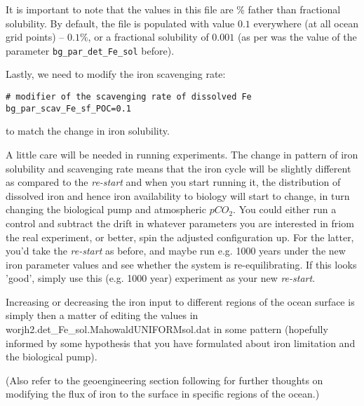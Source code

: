 \begin{enumerate}[noitemsep]
It is important to note that the values in this file are \% father than fractional solubility. By default, the file is populated with value \(0.1\) everywhere (at all ocean grid points) -- \(0.1\%\), or a fractional solubility of \(0.001\) (as per was the value of the parameter \texttt{\small bg\_par\_det\_Fe\_sol} before).

\vspace{1mm}
Lastly, we need to modify the iron scavenging rate:
\vspace{-1mm}\small\begin{verbatim}
# modifier of the scavenging rate of dissolved Fe
bg_par_scav_Fe_sf_POC=0.1
\end{verbatim}\normalsize\vspace{-1mm}
to match the change in iron solubility.

\vspace{1mm}
A little care will be needed in running experiments. The change in pattern of iron solubility and  scavenging rate means that the iron cycle will be slightly different as compared to the \textit{re-start} and when you start running it, the distribution of dissolved iron and hence iron availability to biology will start to change, in turn changing the biological pump and atmospheric \(pCO_{2}\). You could either run a control and subtract the drift in whatever parameters you are interested in friom the real experiment, or better, spin the adjusted configuration up. For the latter, you'd take the \textit{re-start} as before, and maybe run e.g. 1000 years under the new iron parameter values and see whether the system is re-equilibrating. If this looks 'good', simply use this (e.g. 1000 year) experiment as your new \textit{re-start}.

\vspace{1mm}
Increasing or decreasing the iron input to different regions of the ocean surface is simply then a matter of editing the values in \textsf{\footnotesize worjh2.det\_Fe\_sol.MahowaldUNIFORMsol.dat} in some pattern (hopefully informed by some hypothesis that you have formulated about iron limitation and the biological pump).

\vspace{1mm}
(Also refer to the geoengineering section following for further thoughts on modifying the flux of iron to the surface  in specific regions of the ocean.)

\end{enumerate}

\newpage

